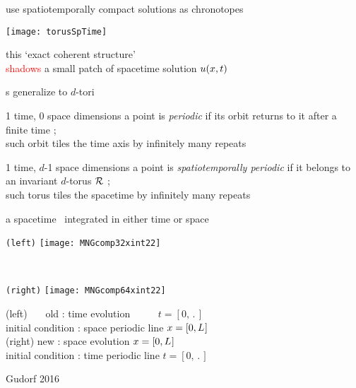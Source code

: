 \begin{frame}{use spatiotemporally compact solutions as chronotopes}
\begin{center}
\texttt{[image: torusSpTime]}
\end{center}
this `exact coherent structure'\\
\textcolor{red}{shadows} a small patch of spacetime solution $u( x, t)$
\end{frame}

\begin{frame}{\po s generalize to $d$-tori}

\begin{block}{1 time, 0 space dimensions}
a {\statesp} point is {\em periodic} if its orbit returns to it
after a finite time \period{} ;
\\
such orbit tiles the time axis
by infinitely many repeats
\end{block}

\bigskip

\begin{block}{1 time, $d$-1 space dimensions}
 a {\statesp} point is {\em spatiotemporally periodic} if
it belongs to \\ an invariant $d$-torus ${\mathcal{R}}$ ;
\\
such torus tiles the spacetime
by infinitely many repeats
\end{block}
\end{frame}

\begin{frame}{a spacetime \twot\ integrated in either time or space}
\begin{center}
  \begin{minipage}[height=.40\textheight]{.35\textwidth}
    \centering \small{\texttt{(left)}}
    \texttt{[image: MNGcomp32xint22]}
  \end{minipage}
~~~~~~~~~
  \begin{minipage}[height=.40\textheight]{.35\textwidth}
    \centering \small{\texttt{(right)}}
    \texttt{[image: MNGcomp64xint22]}
  \end{minipage}
\end{center}
    (left) ~~~old : time evolution
    ~~~~~$t=[0,\period{}]$ %
        \\ \hfill {\scriptsize
       initial condition : space periodic line $x = [0,{L_{}}]$
                  }
        \\
    (right) new : space evolution
    $x = [0,{L_{}}]$ %
        \\ \hfill {\scriptsize
       initial condition : time periodic line $t = [0,\period{}]$
                  }

\vfill\hfill        Gudorf 2016
\end{frame}

